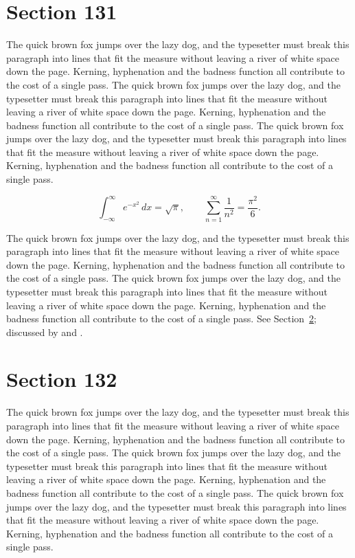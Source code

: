 \documentclass{article}
\begin{document}
\section{Section 131}
\label{sec:131}
The quick brown fox jumps over the lazy dog, and the typesetter must break this paragraph into lines that fit the measure without leaving a river of white space down the page. Kerning, hyphenation and the badness function all contribute to the cost of a single pass. The quick brown fox jumps over the lazy dog, and the typesetter must break this paragraph into lines that fit the measure without leaving a river of white space down the page. Kerning, hyphenation and the badness function all contribute to the cost of a single pass. The quick brown fox jumps over the lazy dog, and the typesetter must break this paragraph into lines that fit the measure without leaving a river of white space down the page. Kerning, hyphenation and the badness function all contribute to the cost of a single pass. 

\begin{equation}\label{eq:131}
\int_{-\infty}^{\infty} e^{-x^{2}}\,dx = \sqrt{\pi}, \qquad
\sum_{n=1}^{\infty} \frac{1}{n^{2}} = \frac{\pi^{2}}{6}.
\end{equation}

The quick brown fox jumps over the lazy dog, and the typesetter must break this paragraph into lines that fit the measure without leaving a river of white space down the page. Kerning, hyphenation and the badness function all contribute to the cost of a single pass. The quick brown fox jumps over the lazy dog, and the typesetter must break this paragraph into lines that fit the measure without leaving a river of white space down the page. Kerning, hyphenation and the badness function all contribute to the cost of a single pass. 
See Section~\ref{sec:132}; discussed by \textcite{k2} and \textcite{l4}.
\section{Section 132}
\label{sec:132}
The quick brown fox jumps over the lazy dog, and the typesetter must break this paragraph into lines that fit the measure without leaving a river of white space down the page. Kerning, hyphenation and the badness function all contribute to the cost of a single pass. The quick brown fox jumps over the lazy dog, and the typesetter must break this paragraph into lines that fit the measure without leaving a river of white space down the page. Kerning, hyphenation and the badness function all contribute to the cost of a single pass. The quick brown fox jumps over the lazy dog, and the typesetter must break this paragraph into lines that fit the measure without leaving a river of white space down the page. Kerning, hyphenation and the badness function all contribute to the cost of a single pass. 
\end{document}
